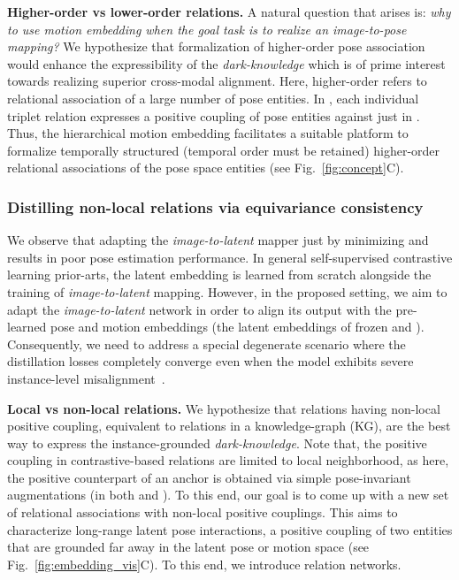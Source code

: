 \documentclass{article}
\begin{document}
\textbf{Higher-order vs lower-order relations.} A natural question that arises is: \textit{why to use motion embedding when the goal task is to realize an image-to-pose mapping?} We hypothesize that formalization of higher-order pose association would enhance the expressibility of the \textit{dark-knowledge} which is of prime interest towards realizing superior cross-modal alignment. Here, higher-order refers to relational association of a large number of pose entities. In , each individual triplet relation expresses a positive coupling of  pose entities against just  in . Thus, the hierarchical motion embedding facilitates a suitable platform to formalize temporally structured (temporal order must be retained) higher-order relational associations of the pose space entities (see Fig.~\ref{fig:concept}{\color{red}C}).

\subsubsection{Distilling non-local relations via equivariance consistency} \vspace{-2mm}
We observe that adapting the \textit{image-to-latent} mapper  just by minimizing  and  results in poor pose estimation performance. In general self-supervised contrastive learning prior-arts, the latent embedding is learned from scratch alongside the training of \textit{image-to-latent} mapping. However, in the proposed setting, we aim to adapt the \textit{image-to-latent} network  in order to align its output with the pre-learned pose and motion embeddings (\ie the latent embeddings of frozen  and ). Consequently, we need to address a special degenerate scenario where the distillation losses completely converge even when the model exhibits severe instance-level misalignment~\cite{luo2019taking}. 

\textbf{Local vs non-local relations.} We hypothesize that relations having non-local positive coupling, equivalent to relations in a knowledge-graph (KG), are the best way to express the instance-grounded \textit{dark-knowledge}. Note that, the positive coupling in contrastive-based relations are limited to local neighborhood, as here, the positive counterpart of an anchor is obtained via simple pose-invariant augmentations (\ie  in both  and ). To this end, our goal is to come up with a new set of relational associations with non-local positive couplings. This aims to characterize long-range latent pose interactions, \ie a positive coupling of two entities that are grounded far away in the latent pose or motion space (see Fig.~\ref{fig:embedding_vis}{\color{red}C}). To this end, we introduce relation networks. 
\end{document}
